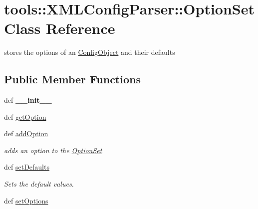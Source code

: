 \hypertarget{classtools_1_1XMLConfigParser_1_1OptionSet}{
\section{tools::XMLConfigParser::OptionSet Class Reference}
\label{classtools_1_1XMLConfigParser_1_1OptionSet}
}
stores the options of an \hyperlink{classtools_1_1XMLConfigParser_1_1ConfigObject}{ConfigObject} and their defaults  


\subsection*{Public Member Functions}
\begin{CompactItemize}
\item 
\hypertarget{classtools_1_1XMLConfigParser_1_1OptionSet_c10781767756a542cd9c5b2beae78186}{
def \textbf{\_\-\_\-init\_\-\_\-}}
\label{classtools_1_1XMLConfigParser_1_1OptionSet_c10781767756a542cd9c5b2beae78186}

\item 
def \hyperlink{classtools_1_1XMLConfigParser_1_1OptionSet_50ceb2f5657667e4c0b3ccd71fbf0986}{getOption}
\item 
\hypertarget{classtools_1_1XMLConfigParser_1_1OptionSet_806b094a77a3f5a3d60134d23c850d26}{
def \hyperlink{classtools_1_1XMLConfigParser_1_1OptionSet_806b094a77a3f5a3d60134d23c850d26}{addOption}}
\label{classtools_1_1XMLConfigParser_1_1OptionSet_806b094a77a3f5a3d60134d23c850d26}

\begin{CompactList}\small\item\em adds an option to the \hyperlink{classtools_1_1XMLConfigParser_1_1OptionSet}{OptionSet} \item\end{CompactList}\item 
def \hyperlink{classtools_1_1XMLConfigParser_1_1OptionSet_6c3e2b6ef7030f2f9525bb52de68531d}{setDefaults}
\begin{CompactList}\small\item\em Sets the default values. \item\end{CompactList}\item 
\hypertarget{classtools_1_1XMLConfigParser_1_1OptionSet_175d8fae91a86d08e6e84c607f014128}{
def \hyperlink{classtools_1_1XMLConfigParser_1_1OptionSet_175d8fae91a86d08e6e84c607f014128}{setOptions}}
\label{classtools_1_1XMLConfigParser_1_1OptionSet_175d8fae91a86d08e6e84c607f014128}


\end{CompactItemize}
